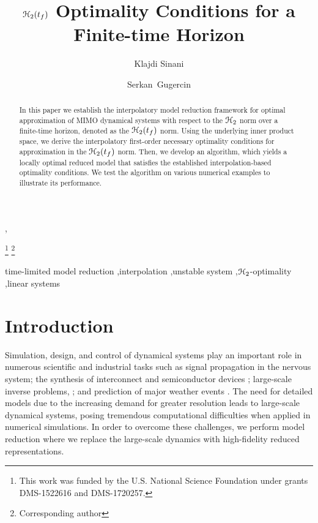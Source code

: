 \documentclass[twocolumn]{autart}
\begin{document}
\begin{frontmatter}
\title{ {$\EuScript{H}_2(t_f)$ Optimality Conditions for a Finite-time Horizon} }
\author{Klajdi Sinani} ,
\author{Serkan~Gugercin} 

\thanks[mytitlenote]{This work was funded by the U.S. National Science Foundation under grants DMS-1522616 and  DMS-1720257.}
\thanks[cor]{Corresponding author }
\address{Department of Mathematics, Virginia Polytechnic Institute and State University, Blacksburg, VA 24061, USA}

\begin{abstract} 
In this paper we establish the interpolatory model reduction framework for optimal approximation of MIMO dynamical systems with respect to the $\EuScript{H}_2$ norm over a finite-time horizon, denoted as the $\EuScript{H}_2(t_f)$ norm.
Using the underlying inner product space, we derive the interpolatory first-order necessary optimality conditions for approximation in the $\EuScript{H}_2(t_f)$ norm. Then,  we  develop an algorithm, which yields a locally optimal reduced model that satisfies the established interpolation-based optimality conditions. We test the algorithm on various numerical examples to illustrate its performance.
\end{abstract}

\begin{keyword}
 time-limited model reduction \sep interpolation \sep unstable system \sep $\EuScript{H}_2$-optimality \sep linear systems 
\end{keyword}

\end{frontmatter}

\section{Introduction}
Simulation, design, and control of dynamical systems play an important role in numerous scientific and industrial tasks such as signal propagation in the nervous system\cite{kellems2009low};  the synthesis  of
interconnect \cite{BonD07} and semiconductor devices \cite{Hess2014}; large-scale inverse problems,
 \cite{Druskin2011solution,Lieberman2010,de2015nonlinear}; and prediction of major weather events \cite{Ant05}.
The need for  detailed  models due to the increasing demand for greater resolution leads to  
large-scale dynamical systems, posing tremendous computational difficulties when applied in numerical simulations. In order to overcome these challenges, we perform  model reduction where we replace the large-scale dynamics with high-fidelity reduced representations.
\end{document}

